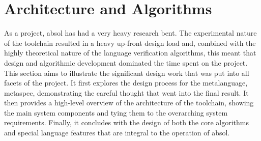 % 

\chapter{Architecture and Algorithms} %
\label{cha:architecture_and_algorithms}

As a project, \gls{absol} has had a very heavy research bent. 
The experimental nature of the toolchain resulted in a heavy up-front design load and, combined with the highly theoretical nature of the language verification algorithms, this meant that design and algorithmic development dominated the time spent on the project.\\

This section aims to illustrate the significant design work that was put into all facets of the project.
It first explores the design process for the metalanguage, \gls{metaspec}, demonstrating the careful thought that went into the final result. 
It then provides a high-level overview of the architecture of the toolchain, showing the main system components and tying them to the overarching system requirements.
Finally, it concludes with the design of both the core algorithms and special language features that are integral to the operation of \gls{absol}. 

